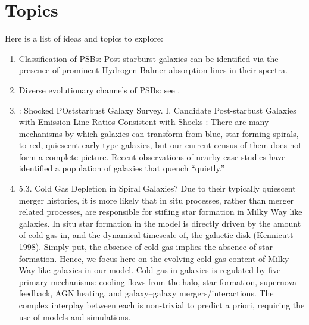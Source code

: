 \section{Topics}
Here is a list of ideas and topics to explore:
\begin{enumerate}
    \item Classification of PSBs: Post-starburst galaxies can be identified via the presence of prominent Hydrogen Balmer absorption lines in their spectra. 
    \item Diverse evolutionary channels of PSBs: see \citet{2019NatAs...3..440P}.
    \item \citet{2016ApJS..224...38A} : Shocked POststarbust Galaxy Survey. I. Candidate Post-starbust Galaxies with Emission Line Ratios Consistent with Shocks : There are many mechanisms by which galaxies can transform from blue, star-forming spirals, to red, quiescent early-type galaxies, but our current census of them does not form a complete picture. Recent observations of nearby case studies have identified a population of galaxies that quench “quietly.” 
    \item \citet{Mutch_2011} 5.3. Cold Gas Depletion in Spiral Galaxies? Due to their typically quiescent merger histories, it is more likely that in situ processes, rather than merger related processes, are responsible for stifling star formation in Milky Way like galaxies. In situ star formation in the model is directly driven by the amount of cold gas in, and the dynamical timescale of, the galactic disk (Kennicutt 1998). Simply put, the absence of cold gas implies the absence of star formation. Hence, we focus here on the evolving cold gas content of Milky Way like galaxies in our model.
    Cold gas in galaxies is regulated by five primary mechanisms: cooling flows from the halo, star formation, supernova feedback, AGN heating, and galaxy–galaxy mergers/interactions. The complex interplay between each is non-trivial to predict a priori, requiring the use of models and simulations.
\end{enumerate}